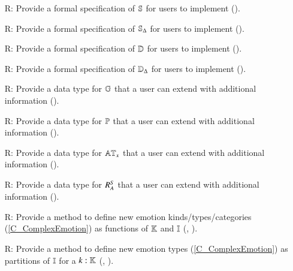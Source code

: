 \begin{itemize}
    \item[R\refstepcounter{reqnum}\thereqnum \label{R_WorldType}:] Provide a
    formal specification of $\mathbb{S}$ for users to implement
    ().

    \item[R\refstepcounter{reqnum}\thereqnum \label{R_WorldChangeType}:]
    Provide a formal specification of $\mathbb{S}_{\Delta}$ for users to
    implement ().

    \item[R\refstepcounter{reqnum}\thereqnum \label{R_DistanceType}:] Provide
    a formal specification of $\mathbb{D}$ for users to implement
    ().

    \item[R\refstepcounter{reqnum}\thereqnum \label{R_DistanceChangeType}:]
    Provide a formal specification of $\mathbb{D}_{\Delta}$ for users to
    implement ().

    \item[R\refstepcounter{reqnum}\thereqnum \label{R_GoalType}:] Provide a
    data type for $\mathbb{G}$ that a user can extend with additional
    information ().

    \item[R\refstepcounter{reqnum}\thereqnum \label{R_PlanType}:] Provide a
    data type for $\mathbb{P}$ that a user can extend with additional
    information ().

    \item[R\refstepcounter{reqnum}\thereqnum \label{R_Attention}:] Provide a
    data type for $\mathbb{AT}_x$ that a user can extend with additional
    information ().

    \item[R\refstepcounter{reqnum}\thereqnum \label{R_SocialAttachment}:]
    Provide a data type for $R_{A}^{S}$ that a user can extend with
    additional information ().

    \item[R\refstepcounter{reqnum}\thereqnum \label{R_MixingEmotionsPES}:]
    Provide a method to define new emotion kinds/types/categories
    (\cref{C_ComplexEmotion}) as functions of $\mathbb{K}$ and
    $\mathbb{I}$ (,
    ).

    \item[R\refstepcounter{reqnum}\thereqnum \label{R_PartitionEmotions}:]
    Provide a method to define new emotion types (\cref{C_ComplexEmotion}) as
    partitions of $\mathbb{I}$ for a $k : \mathbb{K}$
    (, ).


\end{itemize}
